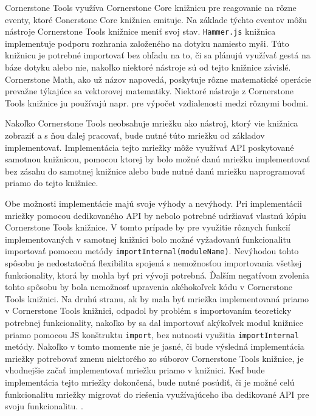 Cornerstone Tools využíva Cornerstone Core knižnicu pre reagovanie na rôzne eventy, ktoré Conerstone Core knižnica emituje. Na základe týchto eventov môžu nástroje Cornerstone Tools knižnice meniť svoj stav.
\texttt{Hammer.js} knižnica implementuje podporu rozhrania založeného na dotyku namiesto myši. Túto knižnicu je potrebné importovať bez ohľadu na to, či sa plánujú využívať gestá na báze dotyku alebo nie, nakoľko niektoré nástroje sú od tejto knižnice závislé.
Cornerstone Math, ako už názov napovedá, poskytuje rôzne matematické operácie prevažne týkajúce sa vektorovej matematiky. Niektoré nástroje z Cornerstone Tools knižnice ju používajú napr. pre výpočet vzdialenosti medzi rôznymi bodmi.

Nakoľko Cornerstone Tools neobsahuje mriežku ako nástroj, ktorý vie knižnica zobraziť a s ňou ďalej pracovať, bude nutné túto mriežku od základov implementovať. Implementácia tejto mriežky môže využívať API poskytované samotnou knižnicou, pomocou ktorej by bolo možné danú mriežku implementovať bez zásahu do samotnej knižnice alebo bude nutné danú mriežku naprogramovať priamo do tejto knižnice.

Obe možnosti implementácie majú svoje výhody a nevýhody.
Pri implementácii mriežky pomocou dedikovaného API by nebolo potrebné udržiavať vlastnú kópiu Cornerstone Tools knižnice. V tomto prípade by pre využitie rôznych funkcií implementovaných v samotnej knižnici bolo možné vyžadovanú funkcionalitu importovať pomocou metódy \texttt{importInternal(moduleName)}. Nevýhodou tohto spôsobu je nedostatočná flexibilita spojená s nemožnosťou importovania všetkej funkcionality, ktorá by mohla byť pri vývoji potrebná. Ďalším negatívom zvolenia tohto spôsobu by bola nemožnosť upravenia akéhokoľvek kódu v Cornerstone Tools knižnici.
Na druhú stranu, ak by mala byť mriežka implementovaná priamo v Cornerstone Tools knižnici, odpadol by problém s importovaním teoreticky potrebnej funkcionality, nakoľko by sa dal importovať akýkoľvek modul knižnice priamo pomocou JS konštruktu \texttt{import}, bez nutnosti využitia \texttt{importInternal} metódy.
Nakoľko v tomto momente nie je jasné, či bude výsledná implementácia mriežky potrebovať zmenu niektorého zo súborov Cornerstone Tools knižnice, je vhodnejšie začať implementovať mriežku priamo v knižnici. Keď bude implementácia tejto mriežky dokončená, bude nutné posúdiť, či je možné celú funkcionalitu mriežky migrovať do riešenia využívajúceho iba dedikované API pre svoju funkcionalitu.  .

